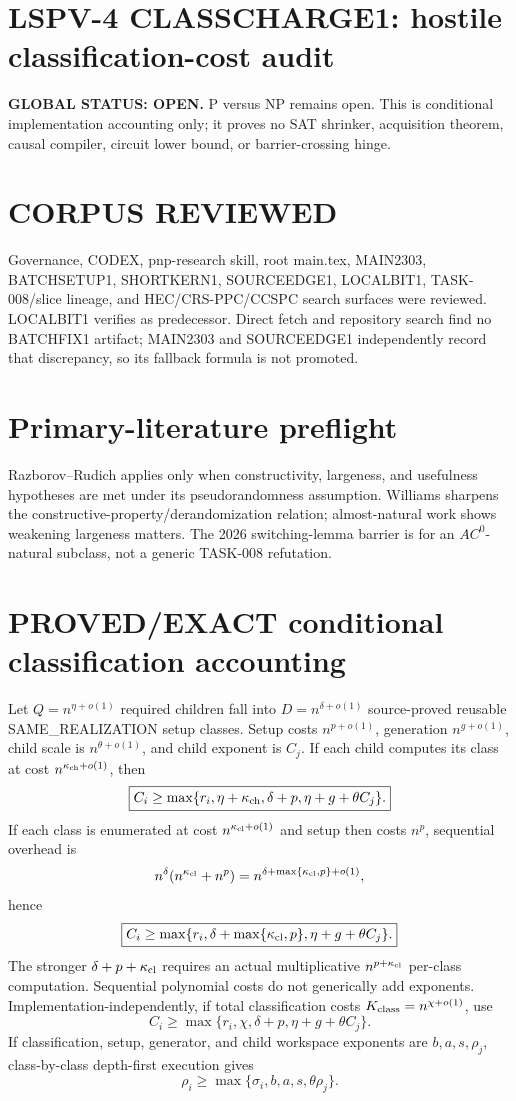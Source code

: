 \documentclass[11pt]{article}
\begin{document}
\section*{LSPV-4 CLASSCHARGE1: hostile classification-cost audit}
\textbf{GLOBAL STATUS: OPEN.} P versus NP remains open. This is conditional implementation accounting only; it proves no SAT shrinker, acquisition theorem, causal compiler, circuit lower bound, or barrier-crossing hinge.
\section*{CORPUS REVIEWED}
Governance, CODEX, pnp-research skill, root main.tex, MAIN2303, BATCHSETUP1, SHORTKERN1, SOURCEEDGE1, LOCALBIT1, TASK-008/slice lineage, and HEC/CRS-PPC/CCSPC search surfaces were reviewed. LOCALBIT1 verifies as predecessor. Direct fetch and repository search find no BATCHFIX1 artifact; MAIN2303 and SOURCEEDGE1 independently record that discrepancy, so its fallback formula is not promoted.
\section*{Primary-literature preflight}
Razborov--Rudich applies only when constructivity, largeness, and usefulness hypotheses are met under its pseudorandomness assumption. Williams sharpens the constructive-property/derandomization relation; almost-natural work shows weakening largeness matters. The 2026 switching-lemma barrier is for an $AC^0$-natural subclass, not a generic TASK-008 refutation.
\section*{PROVED/EXACT conditional classification accounting}
Let $Q=n^{\eta+o(1)}$ required children fall into $D=n^{\delta+o(1)}$ source-proved reusable SAME\_REALIZATION setup classes. Setup costs $n^{p+o(1)}$, generation $n^{g+o(1)}$, child scale is $n^{\theta+o(1)}$, and child exponent is $C_j$.
If each child computes its class at cost $n^{\kappa_{\rm ch}+o(1)}$, then
\[\boxed{C_i\ge\max\{r_i,\eta+\kappa_{\rm ch},\delta+p,\eta+g+\theta C_j\}.}\]
If each class is enumerated at cost $n^{\kappa_{\rm cl}+o(1)}$ and setup then costs $n^p$, sequential overhead is
\[n^\delta(n^{\kappa_{\rm cl}}+n^p)=n^{\delta+\max\{\kappa_{\rm cl},p\}+o(1)},\]
hence
\[\boxed{C_i\ge\max\{r_i,\delta+\max\{\kappa_{\rm cl},p\},\eta+g+\theta C_j\}.}\]
The stronger $\delta+p+\kappa_{\rm cl}$ requires an actual multiplicative $n^{p+\kappa_{\rm cl}}$ per-class computation. Sequential polynomial costs do not generically add exponents.
Implementation-independently, if total classification costs $K_{\rm class}=n^{\chi+o(1)}$, use
\[\boxed{C_i\ge\max\{r_i,\chi,\delta+p,\eta+g+\theta C_j\}.}\]
If classification, setup, generator, and child workspace exponents are $b,a,s,\rho_j$, class-by-class depth-first execution gives
\[\boxed{\rho_i\ge\max\{\sigma_i,b,a,s,\theta\rho_j\}.}\]
\end{document}
